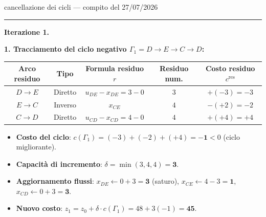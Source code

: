 \documentclass[11pt,a4paper]{article}
\newcommand{\mcfnodes}{%
  \node[nd] (A) at (0,2.1) {$A$};
  \node[nd] (B) at (0,-2.1) {$B$};
  \node[nd] (C) at (3.0,0) {$C$};
  \node[nd] (D) at (6.0,2.1) {$D$};
  \node[nd] (E) at (6.0,-2.1) {$E$};}
\newcommand{\ra}[4]{\draw[#1,thick,black!65] (#2) -- node[font=\scriptsize,black!70,fill=amber!5,inner sep=1pt]{$#4$} (#3);}
\newcommand{\cy}[3]{\draw[->,line width=1.2pt,crimson] (#1) to[bend left=16] node[font=\scriptsize,crimson,fill=amber!5,inner sep=1pt]{$#3$} (#2);}
\newcommand{\fa}[4]{\draw[->,thick,black!45] (#1) -- node[font=\scriptsize,black!55,sloped,above,inner sep=1.5pt]{$#3$} node[font=\small,teal,sloped,below,inner sep=1.5pt]{$\mathbf{#4}$} (#2);}
\begin{document}
\begin{es}{cancellazione dei cicli --- compito del 27/07/2026}
\medskip
\hrule
\medskip

\textbf{Iterazione 1.}

\textbf{1. Tracciamento del ciclo negativo $\Gamma_1 = D \to E \to C \to D$:}
\begin{center}
\small
\begin{tabular}{@{}ccccc@{}}
\toprule
\textbf{Arco residuo} & \textbf{Tipo} & \textbf{Formula residuo $r$} & \textbf{Residuo num.} & \textbf{Costo residuo $c^{\text{res}}$}\\
\midrule
$D \to E$ & Diretto & $u_{DE} - x_{DE} = 3 - 0$ & $3$ & $+(-3) = -3$\\
$E \to C$ & Inverso & $x_{CE}$ & $4$ & $-(+2) = -2$\\
$C \to D$ & Diretto & $u_{CD} - x_{CD} = 4 - 0$ & $4$ & $+(+4) = +4$\\
\bottomrule
\end{tabular}
\end{center}
\begin{itemize}[itemsep=0.15em]
\item \textbf{Costo del ciclo}: $c(\Gamma_1) = (-3) + (-2) + (+4) = \mathbf{-1} < 0$ (ciclo migliorante).
\item \textbf{Capacità di incremento}: $\delta = \min(3, 4, 4) = \mathbf{3}$.
\item \textbf{Aggiornamento flussi}:
  $x_{DE} \leftarrow 0 + 3 = \mathbf{3}$ (saturo), \quad
  $x_{CE} \leftarrow 4 - 3 = \mathbf{1}$, \quad
  $x_{CD} \leftarrow 0 + 3 = \mathbf{3}$.
\item \textbf{Nuovo costo}: $z_1 = z_0 + \delta \cdot c(\Gamma_1) = 48 + 3(-1) = \mathbf{45}$.
\end{itemize}

\begin{center}
\begin{minipage}[t]{0.48\textwidth}\centering
{}
\par\vspace{1mm}{\scriptsize $G_x$ iniziale: evidenziato $\Gamma_1$ ($c=-1$, $\delta=3$)}
\end{minipage}\hfill
\begin{minipage}[t]{0.48\textwidth}\centering
{}
\par\vspace{1mm}{\scriptsize $G$ dopo iterazione 1 (costo $45$)}
\end{minipage}
\end{center}


\end{es}
\end{document}
